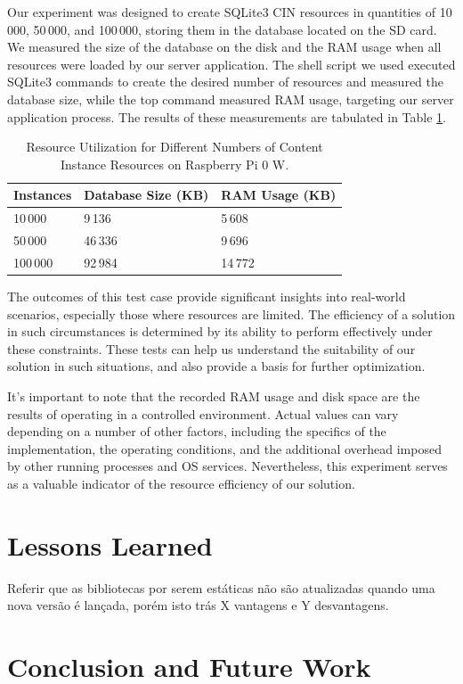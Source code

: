 \documentclass[a4paper,fleqn]{cas-dc}
\begin{document}
Our experiment was designed to create SQLite3 CIN resources in quantities of 10\,000, 50\,000, and 100\,000, storing them in the database located on the SD card. We measured the size of the database on the disk and the RAM usage when all resources were loaded by our server application. The shell script we used executed SQLite3 commands to create the desired number of resources and measured the database size, while the top command measured RAM usage, targeting our server application process. The results of these measurements are tabulated in Table \ref{tab:ResourceUtilization}.

\begin{table}[h]
\scriptsize
\centering
\caption{Resource Utilization for Different Numbers of Content Instance Resources on Raspberry Pi 0 W.}
\label{tab:ResourceUtilization}
\begin{tabular}{ p{1.5cm} p{2.5cm} p{2.5cm} }
\hline
\textbf{Instances} & \textbf{Database Size (KB)} & \textbf{RAM Usage (KB)} \\
\hline \hline
10\,000 & 9\,136 & 5\,608 \\
50\,000 & 46\,336 & 9\,696 \\
100\,000 & 92\,984 & 14\,772 \\
\hline
\end{tabular}
\end{table}

The outcomes of this test case provide significant insights into real-world scenarios, especially those where resources are limited. The efficiency of a solution in such circumstances is determined by its ability to perform effectively under these constraints. These tests can help us understand the suitability of our solution in such situations, and also provide a basis for further optimization.

It's important to note that the recorded RAM usage and disk space are the results of operating in a controlled environment. Actual values can vary depending on a number of other factors, including the specifics of the implementation, the operating conditions, and the additional overhead imposed by other running processes and OS services. Nevertheless, this experiment serves as a valuable indicator of the resource efficiency of our solution.

\section{Lessons Learned}

Referir que as bibliotecas por serem estáticas não são atualizadas quando uma nova versão é lançada, porém isto trás X vantagens e Y desvantagens.

\section{Conclusion and Future Work}
\label{conclusion}
\printcredits

%
%



\end{document}
